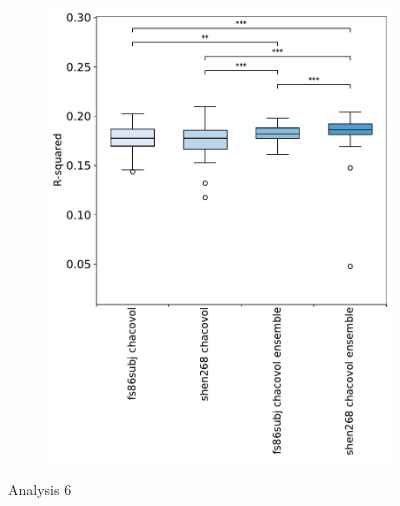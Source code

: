 \documentclass[10pt]{article}
\begin{document}
\begin{figure}
\begin{subfigure}{0.5\textwidth}
  \includegraphics[width=1\linewidth]{figures/analysis_6_boxplots_rsquared.pdf}
  \caption{}
  \label{fig:sfig1}
\end{subfigure}
\caption{Analysis 6}
\label{fig:fig}
\end{figure}
\end{document}
